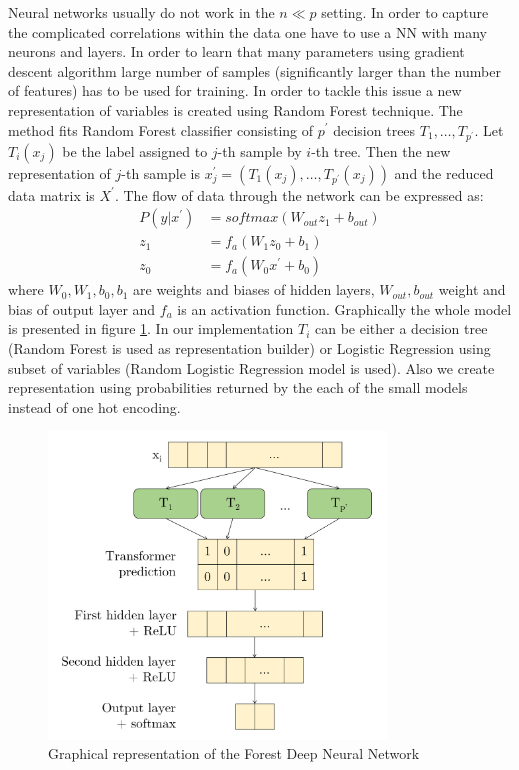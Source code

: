 \documentclass[shortabstract, english, mgr]{iithesis}
\begin{document}
Neural networks usually do not work in the $n \ll p$ setting. In order to capture the complicated correlations within the data one have to use a NN with many neurons and layers. In order to learn that many parameters using gradient descent algorithm large number of samples (significantly larger than the number of features) has to be used for training. In order to tackle this issue a new representation of variables is created using Random Forest technique. The method fits Random Forest classifier consisting of $p^{\prime}$ decision trees $T_1, \ldots, T_{p^{\prime}}$. Let $T_i(x_j)$ be the label assigned to $j$-th sample by $i$-th tree. Then the new representation of $j$-th sample is $x_j^{\prime} = \left(T_1(x_j), \ldots, T_{p^{\prime}}(x_j)\right)$ and the reduced data matrix is $X^{\prime}$. The flow of data through the network can be expressed as:
\begin{align*} 
P(y | x^{\prime}) &= softmax\left(W_{out}z_1+b_{out}\right) \\ 
z_{1} &=f_a\left(W_1z_0+b_1\right) \\ 
z_{0} &=f_a\left(W_0x^{\prime} +b_0\right) 
\end{align*}
where $W_0, W_1, b_0, b_1$ are weights and biases of hidden layers, $W_{out}, b_{out}$ weight and bias of output layer and $f_a$ is an activation function. Graphically the whole model is presented in figure \ref{fig:fDNN}. In our implementation $T_i$ can be either a decision tree (Random Forest is used as representation builder) or Logistic Regression using subset of variables (Random Logistic Regression model is used). Also we create representation using probabilities returned by the each of the small models instead of one hot encoding.

\begin{figure}[H]
\centering
\includegraphics[width=0.8\textwidth]{images/FDNN.png}
\caption{Graphical representation of the Forest Deep Neural Network}
\label{fig:fDNN}
\end{figure}
\end{document}
